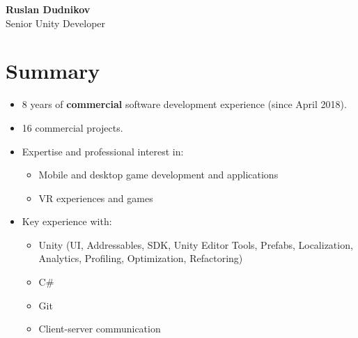 \documentclass[letterpaper,11pt]{article}
\begin{document}
{\Huge\bfseries Ruslan Dudnikov}\\[2pt]
{\large Senior Unity Developer}\\[6pt]

\section*{Summary}
\begin{itemize}[leftmargin=1.4em,itemsep=2pt,topsep=2pt]
  \item 8 years of \textbf{commercial} software development experience (since April 2018).
  \item 16 commercial projects.
  \item Expertise and professional interest in:
    \begin{itemize}[leftmargin=1.4em,itemsep=1pt,topsep=1pt]
      \item Mobile and desktop game development and applications
      \item VR experiences and games
    \end{itemize}
  \item Key experience with:
    \begin{itemize}[leftmargin=1.4em,itemsep=1pt,topsep=1pt]
      \item Unity (UI, Addressables, SDK, Unity Editor Tools, Prefabs, Localization, Analytics, Profiling, Optimization, Refactoring)
      \item C\#
      \item Git
      \item Client-server communication
    \end{itemize}
\end{itemize}

\end{document}
